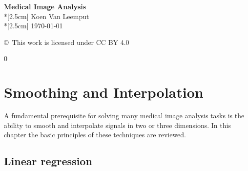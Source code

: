 \documentclass[10pt,twoside]{book}
\def\hideChapterSmoothingAndInterpolation{0}
\begin{document}
\thispagestyle{empty}

\vspace*{\fill}

\begin{center}
{\huge \textbf{Medical Image Analysis}}\\*[2.5cm]
{\Large Koen Van Leemput}\\*[2.5cm]
{\large \today}

\end{center}

\vspace*{\fill}

\newpage

\vspace*{\fill}
\noindent
\copyright \ This work is licensed under CC BY 4.0


\thispagestyle{empty}


\frontmatter
{}



\graphicspath{%
  {./figures/smoothingAndInterpolation/}%
  {./figures/registration/}%
  {./figures/modelBasedSegmentation/}%
  {./figures/neuralNets/}%
  {./figures/atlases/}%
  {./figures/validation/}%
  }

\tableofcontents

\clearpage


\newcommand{\bldgr}[1]{{\mbox{\boldmath {${#1}$}}}} %
\newcommand{\fat}[1]{\mathbf{#1}} %
\newcommand{\transp}{^\mathrm{T}} %
\newcommand{\N}{\mathcal N \mathnormal}


\mainmatter


\clearpage

\if\hideChapterSmoothingAndInterpolation0

\chapter{Smoothing and Interpolation}
\label{chap:smoothingAndInterpolation}

A fundamental prerequisite for solving many medical image analysis tasks is the ability to smooth and interpolate signals in two or three dimensions. In this chapter the basic principles of these techniques are reviewed.


\section{Linear regression}
\label{sec:linearRegression}
\end{document}

